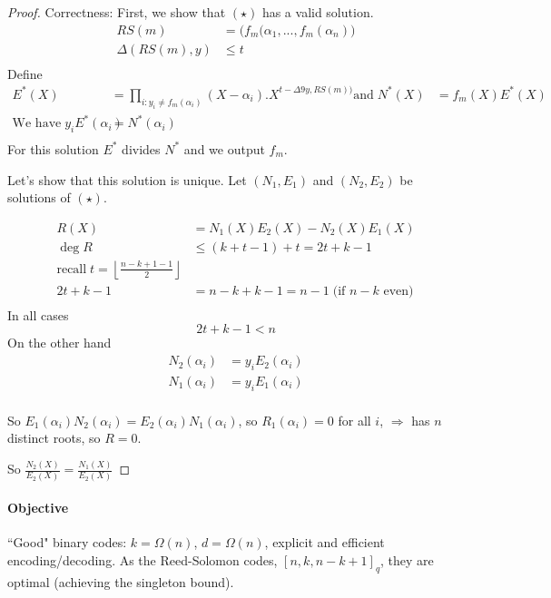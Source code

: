 \documentclass{article}
\begin{document}
\begin{proof}{Correctness:} First, we show that $(\star)$ has a valid solution.
\begin{align*}
RS(m) & = \Big( f_m(\alpha_1,...,f_m(\alpha_n) \Big)\\
\Delta(RS(m),y) & \leq t\\
\end{align*}
Define
\begin{align*}
E^*(X) & = \prod_{i:y_i \neq f_m(\alpha_i)} (X-\alpha_i).X^{t-\Delta 9y,RS(m))}
\text{and}\; N^*(X) & = f_m (X) E^*(X)\\
\text{We have}\; y_iE^*(\alpha_i) & = N^*(\alpha_i)\\
\end{align*}
For this solution $E^*$ divides $N^*$ and we output $f_m$.

Let's show that this solution is unique. Let $(N_1, E_1)$ and $(N_2, E_2)$ be solutions of $(\star)$.

\begin{align*}
R(X) & = N_1(X)E_2(X)-N_2(X)E_1(X)\\
\deg R & \leq (k+t-1) + t = 2t + k - 1\\
\text{recall}\; t= \left\lfloor \frac{n-k+1-1}{2} \right\rfloor\\
2t+k-1 & = n-k+k-1 = n-1 \;\text{(if $n-k$ even)}\\
\end{align*}
In all cases
\[2t + k -1 < n\]
On the other hand
\begin{align*}
N_2(\alpha_i) & = y_i E_2(\alpha_i)\\
N_1(\alpha_i) & = y_i E_1(\alpha_i)\\
\end{align*}

So $E_1(\alpha_i)N_2(\alpha_i)=E_2(\alpha_i)N_1(\alpha_i)$, so $R_1(\alpha_i)=0$ for all $i$, $\Rightarrow$ has $n$  distinct roots, so $R=0$.

So $\frac{N_2(X)}{E_2(X)}=\frac{N_1(X)}{E_2(X)}$ 

\end{proof}


\paragraph{Objective}
``Good" binary codes: $k=\Omega (n)$, $d=\Omega (n)$, explicit and efficient encoding/decoding. As the Reed-Solomon codes, $[n,k,n-k+1]_q$, they are optimal (achieving the singleton bound).
\end{document}
